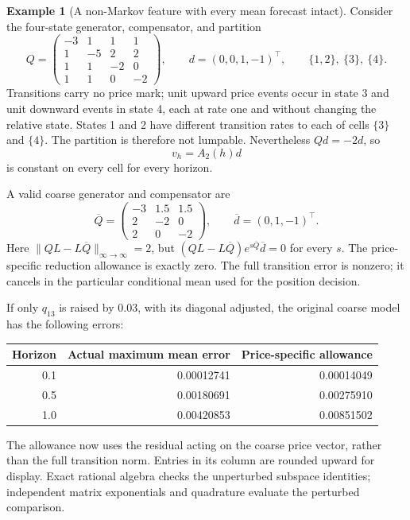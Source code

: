\documentclass[11pt]{article}
\theoremstyle{plain}
\theoremstyle{definition}
\newtheorem{example}[theorem]{Example}
\theoremstyle{remark}
\begin{document}
\begin{example}[A non-Markov feature with every mean forecast intact]
\label{ex:nonlumpableprice}
Consider the four-state generator, compensator, and partition
\[
 Q=\begin{pmatrix}
 -3&1&1&1\\
 1&-5&2&2\\
 1&1&-2&0\\
 1&1&0&-2
 \end{pmatrix},\qquad
 d=(0,0,1,-1)^\top,\qquad
 \{1,2\},\ \{3\},\ \{4\}.
\]
Transitions carry no price mark; unit upward price events occur
in state 3 and unit downward events in state 4, each at rate one
and without changing the relative state. States 1 and 2 have
different transition rates to each of cells \(\{3\}\) and
\(\{4\}\). The partition is therefore not lumpable.
Nevertheless \(Qd=-2d\), so
\[
 v_h=A_2(h)d
\]
is constant on every cell for every horizon.

A valid coarse generator and compensator are
\[
 \overline Q=
 \begin{pmatrix}-3&1.5&1.5\\2&-2&0\\2&0&-2\end{pmatrix},
 \qquad \overline d=(0,1,-1)^\top.
\]
Here \(\|QL-L\overline Q\|_{\infty\to\infty}=2\), but
\((QL-L\overline Q)e^{s\overline Q}\overline d=0\) for every
\(s\). The price-specific reduction allowance is exactly zero.
The full transition error is nonzero; it cancels in the particular
conditional mean used for the position decision.

If only \(q_{13}\) is raised by \(0.03\), with its diagonal
adjusted, the original coarse model has the following errors:
\begin{center}
\begin{tabular}{@{}rrr@{}}
\toprule
Horizon&Actual maximum mean error&Price-specific allowance\\
\midrule
0.1&0.00012741&0.00014049\\
0.5&0.00180691&0.00275910\\
1.0&0.00420853&0.00851502\\
\bottomrule
\end{tabular}
\end{center}
The allowance now uses the residual acting on the coarse price
vector, rather than the full transition norm. Entries in its
column are rounded upward for display. Exact rational algebra
checks the unperturbed subspace identities; independent matrix
exponentials and quadrature evaluate the perturbed comparison.
\end{example}
\end{document}
